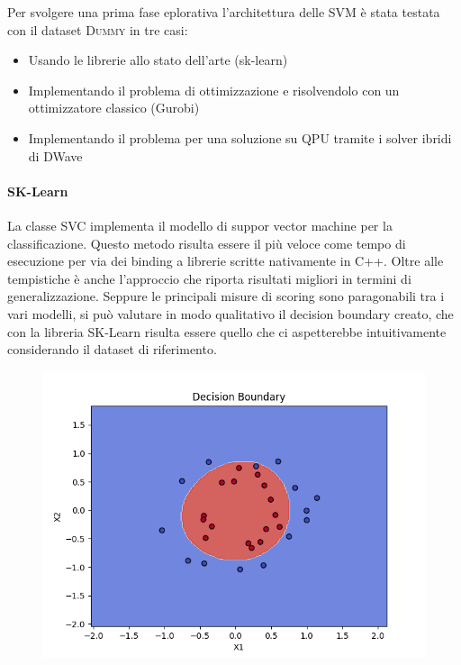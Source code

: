 \documentclass[12pt]{article}
\begin{document}
Per svolgere una prima fase eplorativa l'architettura delle SVM è stata testata con il dataset \textsc{Dummy} in tre casi:
\begin{itemize}
  \item Usando le librerie allo stato dell'arte (sk-learn)
  \item Implementando il problema di ottimizzazione e risolvendolo con un ottimizzatore classico (Gurobi)
  \item Implementando il problema per una soluzione su QPU tramite i solver ibridi di DWave
\end{itemize}

\paragraph{SK-Learn} La classe SVC implementa il modello di suppor vector machine per la classificazione.
Questo metodo risulta essere il più veloce come tempo di esecuzione per via dei binding a librerie scritte nativamente in \textsc{C++}.
Oltre alle tempistiche è anche l'approccio che riporta risultati migliori in termini di generalizzazione.
Seppure le principali misure di scoring sono paragonabili tra i vari modelli, si può valutare in modo qualitativo il decision boundary creato,
che con la libreria SK-Learn risulta essere quello che ci aspetterebbe intuitivamente considerando il dataset di riferimento.

\begin{figure}[H]
  \centering
  \includegraphics[width=\linewidth]{img/decision_boundary_sklearn.png}
\end{figure}
\end{document}
